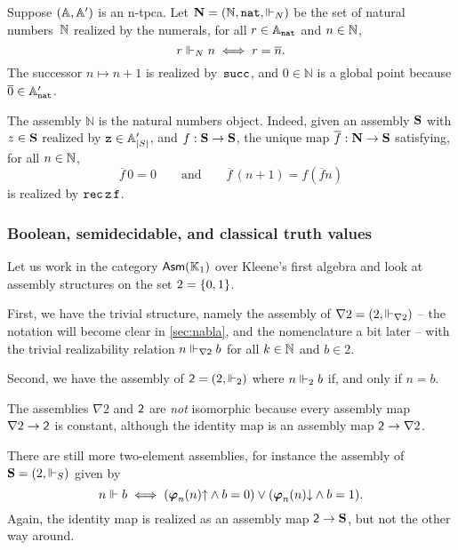 Suppose $(\mathbb{A}, \mathbb{A}')$ is an n-tpca. Let $\mathbf{N} = (\mathbb{N}, \mathtt{nat}, {\Vdash_N})$ be the set of natural numbers~$\mathbb{N}$ realized by the numerals, for all $r \in \mathbb{A}_{\mathtt{nat}}$ and $n \in \mathbb{N}$,
%
\begin{equation*}
  r \Vdash_N n \iff
  r = \overline{n}.
\end{equation*}
%
The successor $n \mapsto n + 1$ is realized by~$\mathtt{succ}$, and $0 \in \mathbb{N}$ is a global point because $\overline{0} \in \mathbb{A}'_{\mathtt{nat}}$.

The assembly $\mathbb{N}$ is the natural numbers object. Indeed, given an assembly $\mathbf{S}$ with $z \in \mathbf{S}$ realized by $\mathtt{z} \in \mathbb{A}'_{|S|}$, and $f : \mathbf{S} \to \mathbf{S}$, the unique map $\overline{f} : \mathbf{N} \to \mathbf{S}$ satisfying, for all $n \in \mathbb{N}$,
%
\begin{equation*}
  \overline{f} \, 0 = 0
  \qquad\text{and}\qquad
  \overline{f} \, (n + 1) = f (\overline{f} n)
\end{equation*}
%
is realized by $\mathtt{rec} \, \mathtt{z} \, \mathtt{f}$.


\subsubsection{Boolean, semidecidable, and classical truth values}
\label{sec:asm-two-element}

Let us work in the category $\mathsf{Asm}(\mathbb{K}_1)$ over Kleene's first algebra and look at assembly structures on the set $2 = \{0, 1\}$.

First, we have the trivial structure, namely the assembly of  $\nabla 2 = (2, {\Vdash_{\nabla 2}})$ -- the notation will become clear in \cref{sec:nabla}, and the nomenclature a bit later -- with the trivial realizability relation $n \Vdash_{\nabla \mathsf{2}} b$ for all $k \in \mathbb{N}$ and $b \in 2$.

Second, we have the assembly of  $\mathsf{2} = (2, {\Vdash_{2}})$ where $n \Vdash_2 b$ if, and only if $n = b$.

The assemblies $\nabla 2$ and $\mathsf{2}$ are \emph{not} isomorphic because every assembly map $\nabla 2 \to \mathsf{2}$ is constant, although the identity map is an assembly map $\mathsf{2} \to \nabla 2$.

There are still more two-element assemblies, for instance the assembly of  $\mathbf{S} = (2, {\Vdash_S})$ given by
%
\begin{equation*}
  n \Vdash b \iff
  (\text{\boldmath{$\varphi$}}_{n}(n){\uparrow} \land b = 0) \lor (\text{\boldmath{$\varphi$}}_{n}(n){\downarrow} \land b = 1).
\end{equation*}
%
Again, the identity map is realized as an assembly map $\mathsf{2} \to \mathbf{S}$, but not the other way around.

